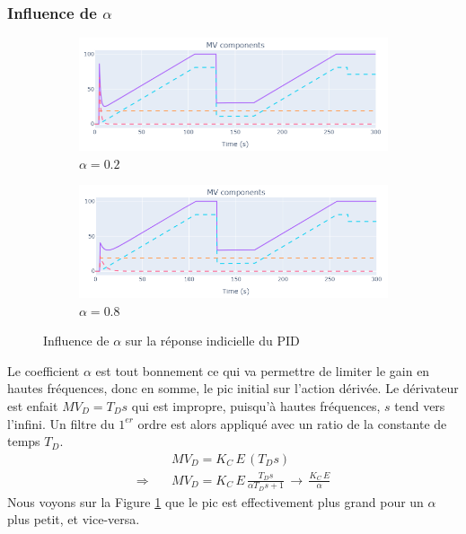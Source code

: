 \subsubsection{Influence de \texorpdfstring{$\alpha$}{alpha}}
\begin{figure}[H]
    \centering
    \begin{subfigure}[b]{0.48\textwidth}
        \includegraphics[width=\textwidth]{../Plots/PID/PID_Response_low_alpha.png}
        \caption{$\alpha = 0.2$}
    \end{subfigure}
    \begin{subfigure}[b]{0.48\textwidth}
        \includegraphics[width=\textwidth]{../Plots/PID/PID_Response_high_alpha.png}
        \caption{$\alpha = 0.8$}
    \end{subfigure}
    \caption{Influence de $\alpha$ sur la réponse indicielle du PID}
    \label{fig:Alpha_Influence_PID}
\end{figure}
Le coefficient $\alpha$ est tout bonnement ce qui va permettre de limiter le gain en hautes fréquences, donc en somme, le pic initial sur l'action dérivée.
Le dérivateur est enfait $MV_D = T_D s$ qui est impropre, puisqu'à hautes fréquences, $s$ tend vers l'infini. Un filtre du $1^{er}$ ordre est alors appliqué avec un ratio de la constante de temps $T_D$.
\begin{align*}
    &MV_D = K_C \, E \, (T_D s)\\
    \Longrightarrow \quad &MV_D = K_C \, E \, \frac{T_D s}{\alpha T_D s + 1} \, \longrightarrow \, \frac{K_C \, E}{\alpha}
\end{align*}
Nous voyons sur la Figure \ref{fig:Alpha_Influence_PID} que le pic est effectivement plus grand pour un $\alpha$ plus petit, et vice-versa.

